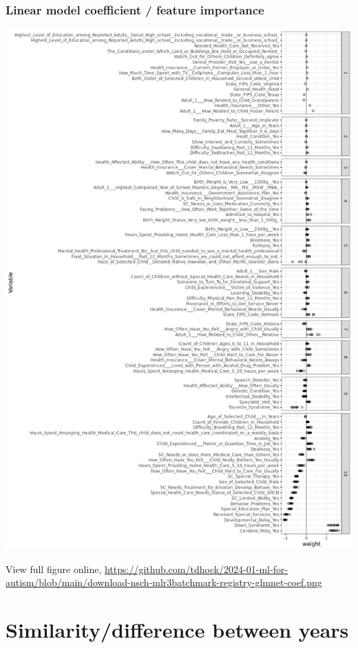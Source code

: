 \documentclass{beamer}
\begin{document}
\begin{frame}
  \frametitle{Linear model coefficient / feature importance}
  \includegraphics[height=0.7\textheight]{download-nsch-mlr3batchmark-registry-glmnet-coef.png}

  View full figure online, \url{https://github.com/tdhock/2024-01-ml-for-autism/blob/main/download-nsch-mlr3batchmark-registry-glmnet-coef.png}
\end{frame}

\section{Similarity/difference between years}
\end{document}
